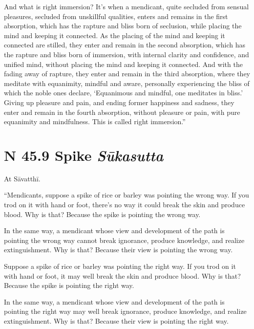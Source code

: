 \documentclass[12pt,openany]{book}%
\newcommand*{\suttatitleacronym}[1]{\smaller[2]{#1}\vspace*{.3em}}
\newcommand*{\suttatitletranslation}[1]{\linebreak{#1}}
\newcommand*{\suttatitleroot}[1]{\linebreak\smaller[2]\itshape{#1}}
\newcommand*{\tocacronym}[1]{\hspace*{-3.3em}{#1}\quad}
\newcommand*{\toctranslation}[1]{#1}
\newcommand*{\tocroot}[1]{(\textit{#1})}
\begin{document}
And what is right immersion? It’s when a mendicant, quite secluded from sensual pleasures, secluded from unskillful qualities, enters and remains in the first absorption, which has the rapture and bliss born of seclusion, while placing the mind and keeping it connected. As the placing of the mind and keeping it connected are stilled, they enter and remain in the second absorption, which has the rapture and bliss born of immersion, with internal clarity and confidence, and unified mind, without placing the mind and keeping it connected. And with the fading away of rapture, they enter and remain in the third absorption, where they meditate with equanimity, mindful and aware, personally experiencing the bliss of which the noble ones declare, ‘Equanimous and mindful, one meditates in bliss.’ Giving up pleasure and pain, and ending former happiness and sadness, they enter and remain in the fourth absorption, without pleasure or pain, with pure equanimity and mindfulness. This is called right immersion.” 

%
\section*{{\suttatitleacronym SN 45.9}{\suttatitletranslation A Spike }{\suttatitleroot Sūkasutta}}
\addcontentsline{toc}{section}{\tocacronym{SN 45.9} \toctranslation{A Spike } \tocroot{Sūkasutta}}

At \textsanskrit{Sāvatthī}. 

“Mendicants, suppose a spike of rice or barley was pointing the wrong way. If you trod on it with hand or foot, there’s no way it could break the skin and produce blood. Why is that? Because the spike is pointing the wrong way. 

In the same way, a mendicant whose view and development of the path is pointing the wrong way cannot break ignorance, produce knowledge, and realize extinguishment. Why is that? Because their view is pointing the wrong way. 

Suppose a spike of rice or barley was pointing the right way. If you trod on it with hand or foot, it may well break the skin and produce blood. Why is that? Because the spike is pointing the right way. 

In the same way, a mendicant whose view and development of the path is pointing the right way may well break ignorance, produce knowledge, and realize extinguishment. Why is that? Because their view is pointing the right way. 
\end{document}
